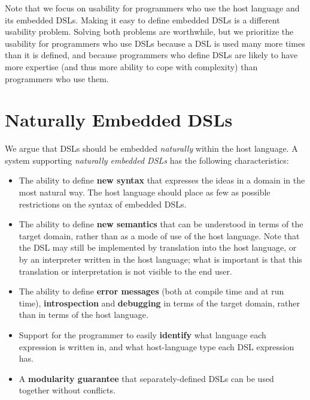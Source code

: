 \documentclass{sigplanconf}
\begin{document}
Note that we focus on usability for programmers who use the host
language and its embedded DSLs.  Making it easy to define embedded
DSLs is a different usability problem.  Solving both problems are
worthwhile, but we prioritize the usability for programmers who
use DSLs because a DSL is used many more times than it is defined,
and because programmers who define DSLs are likely to have more
expertise (and thus more ability to cope with complexity) than
programmers who use them.

\section{Naturally Embedded DSLs}

We argue that DSLs should be embedded \textit{naturally} within the
host language.  A system supporting \textit{naturally embedded DSLs}
has the following characteristics:

\begin{itemize}

\item The ability to define \textbf{new syntax} that expresses the ideas
in a domain in the most natural way.  The host language should place as
few as possible restrictions on the syntax of embedded DSLs.


\item The ability to define \textbf{new semantics} that can be understood
in terms of the target domain, rather than as a mode of use of the host
language.  Note that the DSL may still be implemented by translation into
the host language, or by an interpreter written in the host language; what
is important is that this translation or interpretation is not visible to
the end user.

\item The ability to define \textbf{error messages} (both at compile time
and at run time), \textbf{introspection} and \textbf{debugging} in terms
of the target domain, rather than in terms of the host language.

\item Support for the programmer to easily \textbf{identify} what language
each expression is written in, and what host-language type each DSL
expression has.

\item A \textbf{modularity guarantee} that separately-defined DSLs can
be used together without conflicts.

\end{itemize} 
\end{document}
